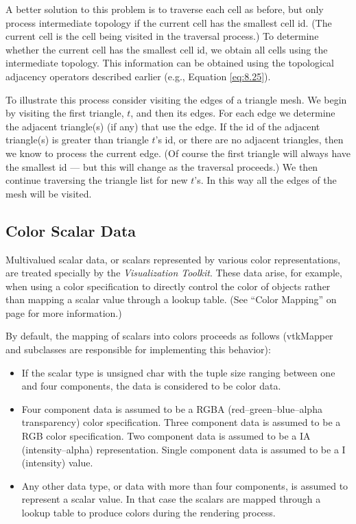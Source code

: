 A better solution to this problem is to traverse each cell as before, but only process intermediate topology if the current cell has the smallest cell id. (The current cell is the cell being visited in the traversal process.) To determine whether the current cell has the smallest cell id, we obtain all cells using the intermediate topology. This information can be obtained using the topological adjacency operators described earlier (e.g., Equation \ref{eq:8.25}).

To illustrate this process consider visiting the edges of a triangle mesh. We begin by visiting the first triangle, $t$, and then its edges. For each edge we determine the adjacent triangle(s) (if any) that use the edge. If the id of the adjacent triangle(s) is greater than triangle $t$'s id, or there are no adjacent triangles, then we know to process the current edge. (Of course the first triangle will always have the smallest id — but this will change as the traversal proceeds.) We then continue traversing the triangle list for new $t$'s. In this way all the edges of the mesh will be visited.

\subsection{Color Scalar Data}

Multivalued scalar data, or scalars represented by various color representations, are treated specially by the \emph{Visualization Toolkit}. These data arise, for example, when using a color specification to directly control the color of objects rather than mapping a scalar value through a lookup table. (See ``Color Mapping'' on page \pageref{subsec:color_mapping} for more information.)

By default, the mapping of scalars into colors proceeds as follows (vtkMapper and subclasses are responsible for implementing this behavior):
\begin{itemize}

\item If the scalar type is unsigned char with the tuple size ranging between one and four components, the data is considered to be color data.

\item Four component data is assumed to be a RGBA (red--green--blue--alpha transparency) color specification. Three component data is assumed to be a RGB color specification. Two component data is assumed to be a IA (intensity--alpha) representation. Single component data is assumed to be a I (intensity) value.

\item Any other data type, or data with more than four components, is assumed to represent a scalar value. In that case the scalars are mapped through a lookup table to produce colors during the rendering process.

\end{itemize}


